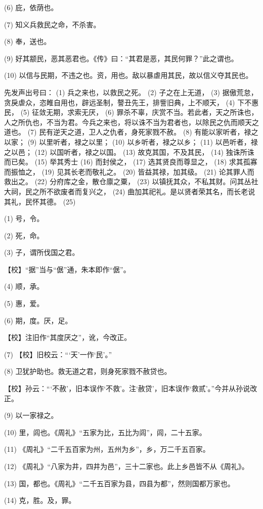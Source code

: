 \documentclass[12pt,UTF8]{ctexbook}
\begin{document}
(6) 庇，依荫也。

(7) 知义兵救民之命，不杀害。

(8) 奉，送也。

(9) 好其颛民，恶其恶君也。《传》曰：“其君是恶，其民何罪？”此之谓也。

(10) 以信与民期，不违之也。资，用也。敌以暴虐用其民，故以信义夺其民也。

先发声出号曰： (1) 兵之来也，以救民之死。 (2) 子之在上无道， (3) 据傲荒怠，贪戾虐众，恣睢自用也，辟远圣制，謷丑先王，排訾旧典，上不顺天， (4) 下不惠民， (5) 征敛无期，求索无厌， (6) 罪杀不辜，庆赏不当。若此者，天之所诛也，人之所仇也，不当为君。今兵之来也，将以诛不当为君者也，以除民之仇而顺天之道也。 (7) 民有逆天之道，卫人之仇者，身死家戮不赦。 (8) 有能以家听者，禄之以家； (9) 以里听者，禄之以里； (10) 以乡听者，禄之以乡； (11) 以邑听者，禄之以邑； (12) 以国听者，禄之以国。 (13) 故克其国，不及其民， (14) 独诛所诛而已矣。 (15) 举其秀士 (16) 而封侯之， (17) 选其贤良而尊显之， (18) 求其孤寡而振恤之， (19) 见其长老而敬礼之。 (20) 皆益其禄，加其级。 (21) 论其罪人而救出之。 (22) 分府库之金，散仓廪之粟， (23) 以镇抚其众，不私其财。问其丛社大祠，民之所不欲废者而复兴之， (24) 曲加其祀礼。是以贤者荣其名，而长老说其礼，民怀其德。 (25)

(1) 号，令。

(2) 死，命。

(3) 子，谓所伐国之君。

【校】“据”当与“倨”通，朱本即作“倨”。

(4) 顺，承。

(5) 惠，爱。

(6) 期，度。厌，足。

【校】注旧作“其度厌之”，讹，今改正。

(7) 【校】旧校云：“‘天’一作‘民’。”

(8) 卫犹护助也。救无道之君，则身死家戮不赦贷也。

【校】孙云：“‘不赦’，旧本误作‘不救’。注‘赦贷’，旧本误作‘救贰’。”今并从孙说改正。

(9) 以一家禄之。

(10) 里，闾也。《周礼》“五家为比，五比为闾”，闾，二十五家。

(11) 《周礼》“二千五百家为州，五州为乡”，乡，万二千五百家。

(12) 《周礼》“八家为井，四井为邑”，三十二家也。此上乡邑皆不从《周礼》。

(13) 国，都也。《周礼》“二千五百家为县，四县为都”，然则国都万家也。

(14) 克，胜。及，罪。
\end{document}

